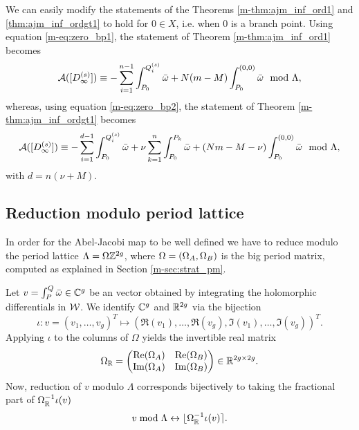\documentclass[main.tex]{subfiles}
\begin{document}
    \begin{rmk}\label{rmk:zero_bp}
     We can easily modify the statements of the Theorems \ref{m-thm:ajm_inf_ord1} and \ref{thm:ajm_inf_ordgt1} to hold for
     $0 \in X$, i.e. when $0$ is a branch point.
     Using equation \eqref{m-eq:zero_bp1}, the statement of Theorem \ref{m-thm:ajm_inf_ord1} becomes
      \begin{equation*}
       \mathcal{A}( [D_{\infty}^{(s)}] ) \equiv -\sum_{i = 1}^{n-1} \int_{P_0}^{Q_i^{(s)}} \bar{\omega} + N(m-M) \int_{P_0}^{(0,0)} \bar{\omega} \mod \Lambda,
    \end{equation*}
    whereas, using equation \eqref{m-eq:zero_bp2}, the statement of Theorem \ref{m-thm:ajm_inf_ordgt1} becomes
      \begin{equation*}
       \mathcal{A}( [D_{\infty}^{(s)}] ) \equiv -\sum_{i = 1}^{d-1} \int_{P_0}^{Q_i^{(s)}} \bar{\omega} + \nu \sum_{k=1}^n
      \int_{P_0}^{P_k} \bar{\omega} + (Nm-M-\nu) \int_{P_0}^{(0,0)} \bar{\omega} \mod \Lambda,
    \end{equation*}
    with $d = n(\nu+M)$.
    \end{rmk}

  \subsection{Reduction modulo period lattice}\label{subsec:lat_red}

    In order for the Abel-Jacobi map to be well defined we have to reduce modulo the period lattice $\Lambda =
  \Omega\mathbb{Z}^{2g}$, where $\Omega = (\Omega_A, \Omega_B)$ is the big period matrix, computed as explained in
  Section \ref{m-sec:strat_pm}.


   Let $v = \int_P^Q \bar{\omega} \in \mathbb{C}^g$ be an vector obtained by integrating the holomorphic differentials in
   $\mathcal{W}$.
   We identify $\mathbb{C}^g$ and $\mathbb{R}^{2g}$ via the bijection
   \begin{equation*}
    \iota: v = (v_1,\dots,v_g)^T \mapsto (\Re(v_1),\dots,\Re(v_g),\Im(v_1),\dots,\Im(v_g))^T.
   \end{equation*}
    Applying $\iota$ to the columns of $\Omega$ yields the invertible real matrix
   \begin{equation*}
    \Omega_{\mathbb{R}} =
   \begin{pmatrix}
     \operatorname{Re}(\Omega_A) & \operatorname{Re}(\Omega_B) \\
     \operatorname{Im}(\Omega_A) & \operatorname{Im}(\Omega_B)
    \end{pmatrix} \in \mathbb{R}^{2g \times 2g}.
   \end{equation*}
   Now, reduction of $v$ modulo $\Lambda$ corresponds bijectively to taking the fractional part of $\Omega_{\mathbb{R}}^{-1}\iota(v)$
   \begin{equation*}
    v \bmod \Lambda \leftrightarrow \lfloor \Omega_{\mathbb{R}}^{-1}\iota(v) \rceil.
   \end{equation*}


   \biblio
\end{document}
